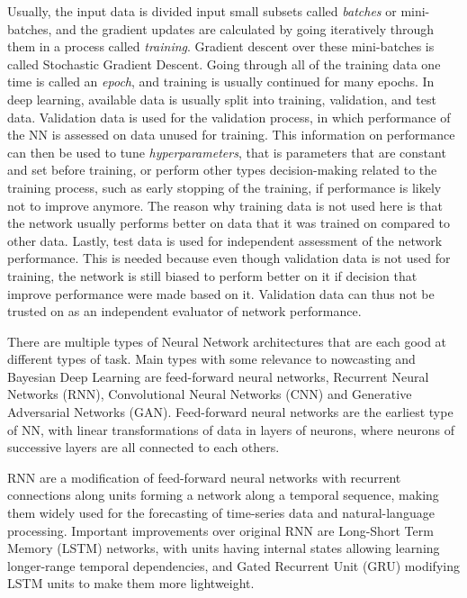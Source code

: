 Usually, the input data is divided input small subsets called \textit{batches} or mini-batches, and the gradient updates are calculated by going iteratively through them in a process called \textit{training}. Gradient descent over these mini-batches is called Stochastic Gradient Descent. Going through all of the training data one time is called an \textit{epoch}, and training is usually continued for many epochs. In deep learning, available data is usually split into training, validation, and test data. Validation data is used for the validation process, in which performance of the NN is assessed on data unused for training. This information on performance can then be used to tune \textit{hyperparameters}, that is parameters that are constant and set before training, or perform other types decision-making related to the training process, such as early stopping of the training, if performance is likely not to improve anymore. The reason why training data is not used here is that the network usually performs better on data that it was trained on compared to other data. Lastly, test data is used for independent assessment of the network performance. This is needed because even though validation data is not used for training, the network is still biased to perform better on it if decision that improve performance were made based on it. Validation data can thus not be trusted on as an independent evaluator of network performance. 

There are multiple types of Neural Network architectures that are each good at different types of task. Main types with some relevance to nowcasting and Bayesian Deep Learning are feed-forward neural networks, Recurrent Neural Networks (RNN), Convolutional Neural Networks (CNN) and Generative Adversarial Networks (GAN). Feed-forward neural networks are the earliest type of NN, with linear transformations of data in layers of neurons, where neurons of successive layers are all connected to each others.

 RNN are a modification of feed-forward neural networks with recurrent connections along units forming a network along a temporal sequence, making them widely used for the forecasting of time-series data and natural-language processing. Important improvements over original RNN are Long-Short Term Memory (LSTM) networks, with units having internal states allowing learning longer-range temporal dependencies, and Gated Recurrent Unit (GRU) modifying LSTM units to make them more lightweight. 

